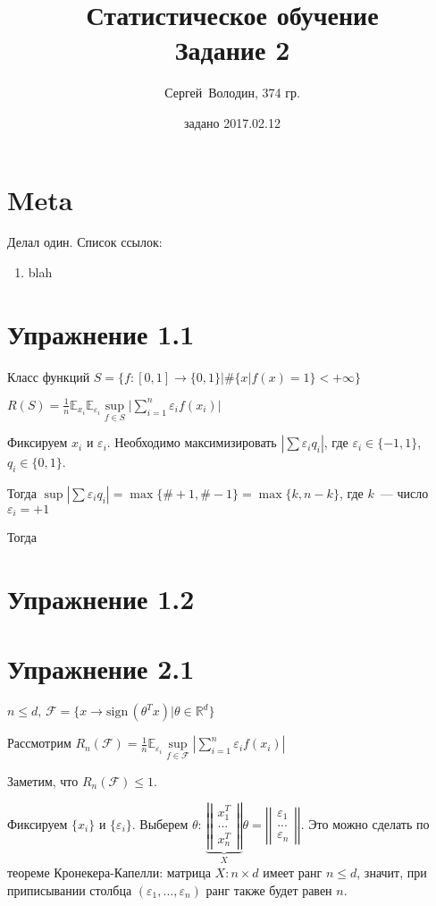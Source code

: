 \documentclass[a4paper]{article}
\title{Статистическое обучение\\Задание 2}
\date{задано 2017.02.12}
\author{Сергей~Володин, 374 гр.}
\newcommand{\matrixl}{\left|\left|}
\newcommand{\matrixr}{\right|\right|}
\newcommand{\sign}{\mbox{sign}\,}
\newcommand{\F}{\mathcal{F}}
\newcommand{\R}{\mathbb{R}}
\def\eps{\varepsilon}
\begin{document}
\maketitle
\section*{Meta}
Делал один. Список ссылок:
\begin{enumerate}
\item blah
\end{enumerate}
\section*{Упражнение 1.1}
Класс функций $S=\{f\colon [0,1]\to\{0,1\}\big| \#\{x|f(x)=1\}<+\infty\}$

$R(S)=\frac{1}{n}\mathbb{E}_{x_i}\mathbb{E}_{\eps_i}\sup\limits_{f\in S}\big|\sum\limits_{i=1}^n\eps_if(x_i)\big|$

Фиксируем $x_i$ и $\eps_i$. Необходимо максимизировать $|\sum \eps_i q_i|$, где $\eps_i\in\{-1,1\}$, $q_i\in\{0,1\}$.

Тогда $\sup|\sum \eps_i q_i|=\max\{\#+1,\#-1\}=\max\{k,n-k\}$, где $k$~--- число $\eps_i=+1$

Тогда $ $
\section*{Упражнение 1.2}

\section*{Упражнение 2.1}
$n\leqslant d,\,\mathcal{F}=\{x\to \sign(\theta^Tx)\big| \theta\in\R^d\}$

Рассмотрим $R_n(\F)=\frac{1}{n}\mathbb{E}_{\eps_i}\sup\limits_{f\in\F}|\sum\limits_{i=1}^n \eps_i f(x_i)|$

Заметим, что $\boxed{R_n(\F)\leqslant 1}$.

Фиксируем $\{x_i\}$ и $\{\eps_i\}$. Выберем $\theta$: $\underbrace{\matrixl\begin{array}{c}
x_1^T\\
...\\
x_n^T
\end{array}\matrixr}_X\theta=\matrixl\begin{array}{c}
\eps_1\\
...\\
\eps_n
\end{array}
\matrixr$. Это можно сделать по теореме Кронекера-Капелли: матрица $X\colon n\times d$ имеет ранг $n\leqslant d$, значит, при приписывании столбца $(\eps_1,...,\eps_n)$ ранг также будет равен $n$.
\end{document}
